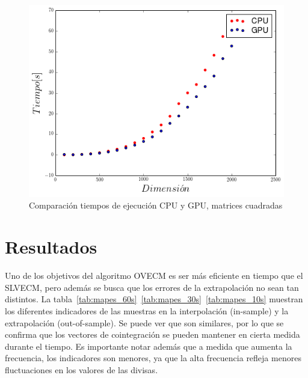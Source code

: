 \begin{figure}[h!t]
    \begin{center}
        \includegraphics[width=\textwidth]{images/speed_up_square}
        \caption{Comparación tiempos de ejecución CPU y GPU, matrices cuadradas}
        \label{fig:speedup_square}
    \end{center}
\end{figure}

\section{Resultados}
Uno de los objetivos del algoritmo OVECM es ser más eficiente en tiempo que el
SLVECM, pero además se busca que los errores de la extrapolación no sean tan
distintos. La tabla~\ref{tab:mapes_60s}~\ref{tab:mapes_30s}~\ref{tab:mapes_10s}
muestran los diferentes indicadores de las muestras en la interpolación
(in-sample) y la extrapolación (out-of-sample). Se puede ver que son similares,
por lo que se confirma que los vectores de cointegración se pueden mantener en
cierta medida durante el tiempo. Es importante notar además que a medida que
aumenta la frecuencia, los indicadores son menores, ya que la alta frecuencia
refleja menores fluctuaciones en los valores de las divisas.

